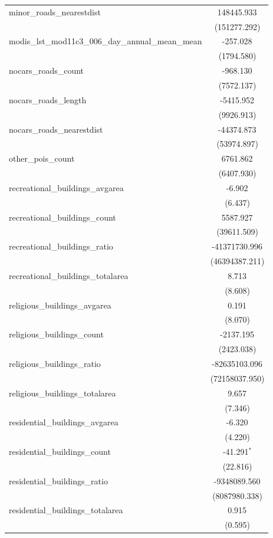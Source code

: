 \begin{table}[!htbp]
\begin{tabular}{@{\extracolsep{5pt}}lc}
 minor_roads_nearestdist & 148445.933$^{}$ \\
  & (151277.292) \\
 modis_lst_mod11c3_006_day_annual_mean_mean & -257.028$^{}$ \\
  & (1794.580) \\
 nocars_roads_count & -968.130$^{}$ \\
  & (7572.137) \\
 nocars_roads_length & -5415.952$^{}$ \\
  & (9926.913) \\
 nocars_roads_nearestdist & -44374.873$^{}$ \\
  & (53974.897) \\
 other_pois_count & 6761.862$^{}$ \\
  & (6407.930) \\
 recreational_buildings_avgarea & -6.902$^{}$ \\
  & (6.437) \\
 recreational_buildings_count & 5587.927$^{}$ \\
  & (39611.509) \\
 recreational_buildings_ratio & -41371730.996$^{}$ \\
  & (46394387.211) \\
 recreational_buildings_totalarea & 8.713$^{}$ \\
  & (8.608) \\
 religious_buildings_avgarea & 0.191$^{}$ \\
  & (8.070) \\
 religious_buildings_count & -2137.195$^{}$ \\
  & (2423.038) \\
 religious_buildings_ratio & -82635103.096$^{}$ \\
  & (72158037.950) \\
 religious_buildings_totalarea & 9.657$^{}$ \\
  & (7.346) \\
 residential_buildings_avgarea & -6.320$^{}$ \\
  & (4.220) \\
 residential_buildings_count & -41.291$^{*}$ \\
  & (22.816) \\
 residential_buildings_ratio & -9348089.560$^{}$ \\
  & (8087980.338) \\
 residential_buildings_totalarea & 0.915$^{}$ \\
  & (0.595) \\

\end{tabular}
\end{table}
